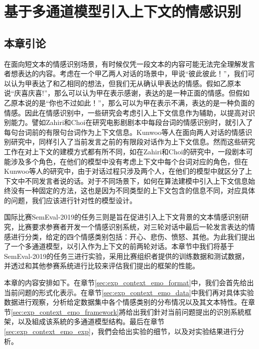 \chapter{基于多通道模型引入上下文的情感识别}
\label{cha:exp_context_emo}

\section{本章引论}

在面向短文本的情感识别场景，有时候仅凭一段文本的内容可能无法完全理解发言者想表达的内容。考虑在一个甲乙两人对话的场景中，甲说“彼此彼此！”，我们可以认为甲表达了和乙相同的想法，但我们无从确认甲表达的情感。假如乙原本说“庆喜庆喜!”，那么可以认为甲在表示感谢，表达的是一种正面的情感。但假如乙原本说的是“你也不过如此！”，那么可以为甲在表示不满，表达的是一种负面的情感。因此在情感识别中，一些研究会考虑引入上下文信息作为辅助，以提高对识别能力。譬如Zahiri和Choi\cite{Zahiri2017Emotion}在研究电影剧剧本中每段台词的情感识别时，就引入了每句台词前的有限句台词作为上下文信息。Kunwoo等人\cite{hazarika2018conversational}在面向两人对话的情感识别研究中，同样引入了当前发言之前的有限段对话作为上下文信息。然而这些研究工作在对上下文的建模方式都有所不同，如在Zahiri和Choi\cite{Zahiri2017Emotion}的研究中，一段剧本可能涉及多个角色，在他们的模型中没有考虑上下文中每个台词对应的角色，但在Kunwoo等人\cite{hazarika2018conversational}的研究中，由于对话过程只涉及两个人，在他们的模型中就区分了上下文中不同发言者说的话。对于不同场景下，如何在算法建模中引入上下文信息始终没有一种固定的方法，这也是因为不同类型的上下文包含的信息不同，对应具体的问题，我们应该进行针对性的模型设计。

国际比赛SemEval-2019的任务三\cite{SemEval2019Task3}则是旨在促进引入上下文背景的文本情感识别研究，比赛要求参赛者开发一个情感识别系统，对三轮对话中最后一轮发言表达的情感进行分类，给定的四个情感类别包括：开心、悲伤、愤怒、其他。为此我们提出了一个多通道模型，以引入作为上下文的前两轮对话。本章节中我们将基于SemEval-2019的任务三进行实验，采用比赛组织者提供的训练数据和测试数据，并透过和其他参赛系统进行比较来评估我们提出的框架的性能。

本章的内容安排如下。在章节\ref{sec:exp_context_emo_format}中，我们会首先给出当前问题的形式化表示。在章节\ref{sec:exp_context_emo_data}中我们再对具体实验数据进行观察，分析给定数据集中各个情感类别的分布情况以及其文本特性。在章节\ref{sec:exp_context_emo_framework}將给出我们針对当前问题提出的识別系統框架，以及組成该系統的多通道模型结构。最后在章节\ref{sec:exp_context_emo_exp}，我們会给出实验的细节，以及对实验结果进行分析。

